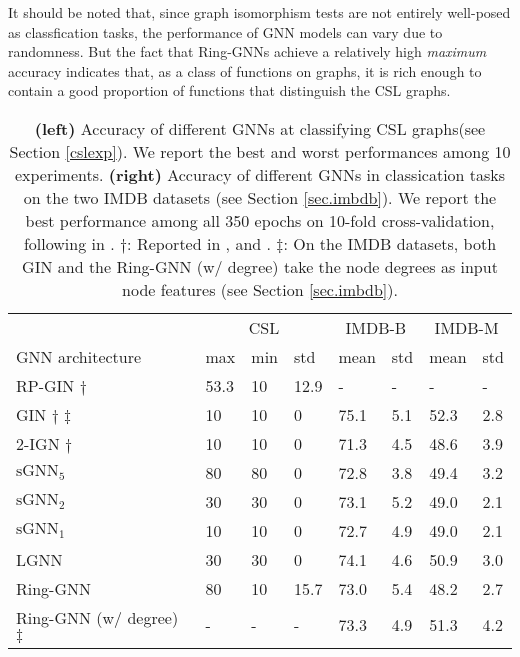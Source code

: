 \documentclass{article}
\begin{document}
It should be noted that, since graph isomorphism tests are not entirely well-posed as classfication tasks, the performance of GNN models can vary due to randomness. But the fact that Ring-GNNs achieve a relatively high \emph{maximum} accuracy indicates that, as a class of functions on graphs, it is rich enough to contain a good proportion of functions that distinguish the CSL graphs. 

\begin{table}[ht]
\centering
\begin{tabular}{l|lll||ll|ll}
\hline
& \multicolumn{3}{|c||}{CSL} & \multicolumn{2}{c|}{IMDB-B} & \multicolumn{2}{c}{IMDB-M} \\
GNN architecture              & max  & min & std  & mean & std & mean & std \\
\hline \hline
RP-GIN $\dagger$              & 53.3 & 10  & 12.9 & -     & -     & -     & -     \\
GIN $\dagger$ $\ddagger$       & 10   & 10  & 0    & 75.1  & 5.1   & 52.3  & 2.8   \\
$2$-IGN $\dagger$ & 10   & 10  & 0    & 71.3 & 4.5   & 48.6 & 3.9   \\
$\text{sGNN}_5$                        & 80   & 80  & 0    & 72.8  & 3.8   & 49.4  & 3.2   \\
$\text{sGNN}_2$                        & 30   & 30  & 0    & 73.1  & 5.2   & 49.0    & 2.1   \\
$\text{sGNN}_1$                        & 10   & 10  & 0    & 72.7  & 4.9   & 49.0    & 2.1   \\
LGNN \cite{chen2019cdsbm}                         & 30   & 30  & 0    & 74.1  & 4.6   & 50.9  & 3.0     \\
Ring-GNN                          & 80   & 10  & 15.7    & 73.0  & 5.4   & 48.2  & 2.7  \\
Ring-GNN (w/ degree) $\ddagger$  &   -    &   -    &   -    &  73.3   & 4.9  & 51.3  & 4.2 \\
\hline
\end{tabular}
\vspace{5pt}
\caption{\textbf{(left)} Accuracy of different GNNs at classifying CSL graphs(see Section \ref{cslexp}). We report the best and worst performances among 10 experiments.
\textbf{(right)} Accuracy of different GNNs in classication tasks on the two IMDB datasets (see Section \ref{sec.imbdb}). We report the best performance among all 350 epochs on 10-fold cross-validation, following in \cite{xu2018powerful}. 
$\dagger$: Reported in \cite{murphy2019relational}, \cite{xu2018powerful} and \cite{maron2018invariant}. 
$\ddagger$: On the IMDB datasets, both GIN and the Ring-GNN (w/ degree) take the node degrees as input node features (see Section \ref{sec.imbdb}). 
}
\label{table.synthetic}
\end{table}
\end{document}

